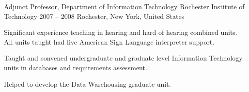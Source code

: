 \begin{cventries}


\cventry
    {Adjunct Professor, Department of Information Technology} %
    {Rochester Institute of Technology} %
    {2007 -- 2008} %
    {Rochester, New York, United States} %
    {\begin{cvitems}%
    \item {Significant experience teaching in hearing and hard of hearing combined units. All units taught had live American Sign Language interpreter support.}
    \item {Taught and convened undergraduate and graduate level Information Technology units in databases and requirements assessment.} 
    \item {Helped to develop the Data Warehousing graduate unit.}
    \end{cvitems}}
    
%     
%     
%     
%       

\end{cventries}
